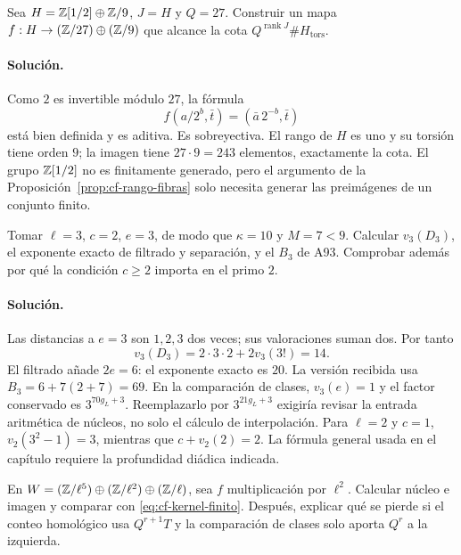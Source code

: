 \begin{ejercicio}
Sea $H=\mathbb{Z}[1/2]\oplus\mathbb{Z}/9$, $J=H$ y $Q=27$.
Construir un mapa $f:H\to(\mathbb{Z}/27)\oplus(\mathbb{Z}/9)$ que alcance
la cota $Q^{\operatorname{rank}J}\#H_{\mathrm{tors}}$.
\end{ejercicio}

\paragraph{Solución.}
Como $2$ es invertible módulo $27$, la fórmula
\[
 f(a/2^b,\bar t)=(\bar a\,2^{-b},\bar t)
\]
está bien definida y es aditiva. Es sobreyectiva.
El rango de $H$ es uno y su torsión tiene orden $9$;
la imagen tiene $27\cdot9=243$ elementos, exactamente
la cota. El grupo $\mathbb{Z}[1/2]$ no es finitamente generado,
pero el argumento de la Proposición~\ref{prop:cf-rango-fibras}
solo necesita generar las preimágenes de un conjunto finito.

\begin{ejercicio}
Tomar $\ell=3$, $c=2$, $e=3$, de modo que $\kappa=10$
y $M=7<9$. Calcular $v_3(D_3)$, el exponente exacto
de filtrado y separación, y el $B_3$ de A93.
Comprobar además por qué la condición $c\ge2$ importa
en el primo $2$.
\end{ejercicio}

\paragraph{Solución.}
Las distancias a $e=3$ son $1,2,3$ dos veces; sus
valoraciones suman dos. Por tanto
\[
 v_3(D_3)=2\cdot3\cdot2+2v_3(3!)=14.
\]
El filtrado añade $2e=6$: el exponente exacto es $20$.
La versión recibida usa
$B_3=6+7(2+7)=69$.
En la comparación de clases, $v_3(e)=1$ y el factor
conservado es $3^{70g_L+3}$. Reemplazarlo por
$3^{21g_L+3}$ exigiría revisar la entrada aritmética
de núcleos, no solo el cálculo de interpolación.
Para $\ell=2$ y $c=1$,
$v_2(3^2-1)=3$, mientras que $c+v_2(2)=2$.
La fórmula general usada en el capítulo requiere
la profundidad diádica indicada.

\clearpage
\begin{ejercicio}
En $W=(\mathbb{Z}/\ell^5)\oplus(\mathbb{Z}/\ell^2)\oplus(\mathbb{Z}/\ell)$,
sea $f$ multiplicación por $\ell^2$.
Calcular núcleo e imagen y comparar con
\eqref{eq:cf-kernel-finito}.
Después, explicar qué se pierde si el conteo homológico
usa $Q^{r+1}T$ y la comparación de clases solo aporta
$Q^r$ a la izquierda.
\end{ejercicio}

